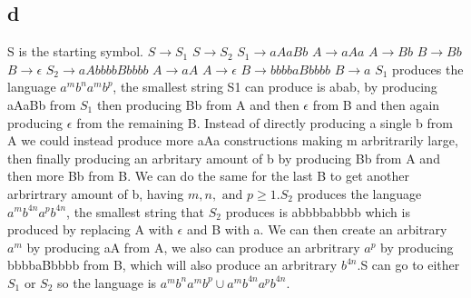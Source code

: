 \documentclass[12pt]{article}
\begin{document}
\subsection*{d} S is the starting symbol. \newline
$S \rightarrow S_1$ \newline
$S \rightarrow S_2$ \newline
$S_1 \rightarrow aAaBb$ \newline
$A \rightarrow aAa$ \newline
$A \rightarrow Bb$ \newline
$B \rightarrow Bb$ \newline
$B \rightarrow \epsilon $ \newline
$S_2 \rightarrow aAbbbbBbbbb$ \newline
$A \rightarrow aA$ \newline
$A \rightarrow \epsilon$ \newline
$B \rightarrow bbbbaBbbbb$ \newline
$B \rightarrow a $ \newline
$S_1$ produces the language $a^mb^na^mb^p$, the smallest string S1 can produce is abab, by producing aAaBb from $S_1$ then producing Bb from A and then $\epsilon$ from B and then again producing $\epsilon$ from the remaining B.  Instead of directly producing a single b from A we could instead produce more aAa constructions making m arbritrarily large, then finally producing an arbritary amount of b by producing Bb from A and then more Bb from B.  We can do the same for the last B to get another arbrirtrary amount of b, having $m, n, \text{ and } p \ge 1$.\newline $S_2$ produces the language $a^mb^{4n}a^pb^{4n}$, the smallest string that $S_2$ produces is abbbbabbbb which is produced by replacing A with $\epsilon$ and B with a.  We can then create an arbitrary $a^m$ by producing aA from A, we also can produce an arbritrary $a^p$ by producing bbbbaBbbbb from B, which will also produce an arbritrary $b^{4n}$.\newline S can go to either $S_1$ or $S_2$ so the language is $a^mb^na^mb^p \cup a^mb^{4n}a^pb^{4n}$.
\end{document}
